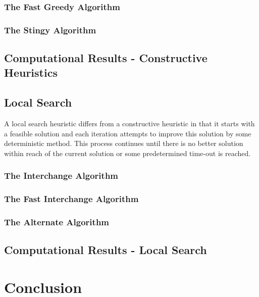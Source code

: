\documentclass[11pt]{article}
\newcommand{\np}{\newpage}
\begin{document}
	
	
	
	
	\subsubsection{The Fast Greedy Algorithm}
	
	
	\subsubsection{The Stingy Algorithm}
	
	
	\subsection{Computational Results - Constructive Heuristics}
	
	
	\subsection{Local Search}
	A local search heuristic differs from a constructive heuristic in that it starts with a feasible solution and each iteration attempts to improve this solution by some deterministic method.  This process continues until there is no better solution within reach of the current solution or some predetermined time-out is reached.
	
	\subsubsection{The Interchange Algorithm}
	
	
	\subsubsection{The Fast Interchange Algorithm}
	
	
	\subsubsection{The Alternate Algorithm}
	
	
	\subsection{Computational Results - Local Search}
	
	
	
	\section{Conclusion}
		
		
	\np
	
	
	\np

	\printindex[terms]
	\printindex[authors]
	
\end{document}
